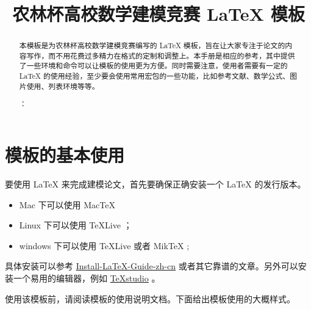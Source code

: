 \documentclass[withoutpreface,bwprint]{main} %
\title{农林杯高校数学建模竞赛 \LaTeX{} 模板}
\begin{document}
 \maketitle
 \begin{abstract}
本模板是为农林杯高校数学建模竞赛编写的 \LaTeX{} 模板，旨在让大家专注于论文的内容写作，而不用花费过多精力在格式的定制和调整上。本手册是相应的参考，其中提供了一些环境和命令可以让模板的使用更为方便。同时需要注意，使用者需要有一定的 \LaTeX{} 的使用经验，至少要会使用常用宏包的一些功能，比如参考文献、数学公式、图片使用、列表环境等等。



：

\end{abstract}

\tableofcontents

\newpage

\section{模板的基本使用}

要使用 \LaTeX{} 来完成建模论文，首先要确保正确安装一个 \LaTeX{} 的发行版本。

\begin{itemize}
    \item Mac 下可以使用 Mac\TeX{}
    \item Linux 下可以使用 \TeX{}Live ；
    \item windows 下可以使用 \TeX{}Live 或者 Mik\TeX{} ;
\end{itemize}

具体安装可以参考 \href{https://github.com/OsbertWang/install-latex-guide-zh-cn/releases/}{Install-LaTeX-Guide-zh-cn} 或者其它靠谱的文章。另外可以安装一个易用的编辑器，例如 \href{https://mirrors.tuna.tsinghua.edu.cn/github-release/texstudio-org/texstudio/LatestRelease/}{\TeX{}studio} 。

使用该模板前，请阅读模板的使用说明文档。下面给出模板使用的大概样式。
\end{document}
